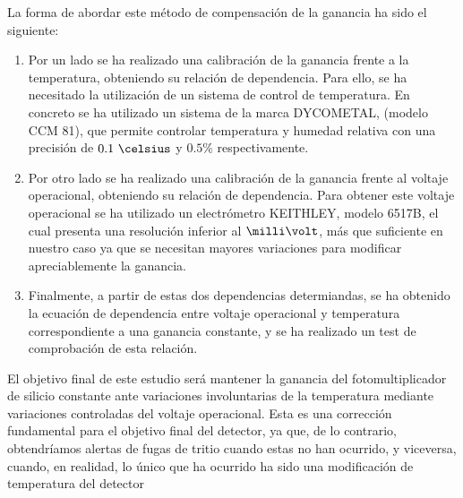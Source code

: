 La forma de abordar este método de compensación de la ganancia ha sido el siguiente:
\begin{enumerate}
\item {} 
Por un lado se ha realizado una calibración de la ganancia frente a la temperatura, obteniendo su relación de dependencia. Para ello, se ha necesitado la utilización de un sistema de control de temperatura. En concreto se ha utilizado un sistema de la marca DYCOMETAL, (modelo CCM 81), que permite controlar temperatura y humedad relativa con una precisión de $0.1~\celsius$   y  $0.5$\% respectivamente.

\item {} Por otro lado se ha realizado una calibración de la ganancia frente al voltaje operacional, obteniendo su relación de dependencia. Para obtener este voltaje operacional se ha utilizado un electrómetro KEITHLEY, modelo 6517B, el cual presenta una resolución inferior al $\milli\volt$, más que suficiente en nuestro caso ya que se necesitan mayores variaciones para modificar apreciablemente  la ganancia.

\item {} Finalmente, a partir de estas dos dependencias determiandas, se ha obtenido la ecuación de dependencia entre voltaje operacional y temperatura correspondiente a una ganancia constante,  y se ha realizado un test de comprobación de esta relación.
\end{enumerate}

El objetivo final de este estudio será mantener la ganancia del fotomultiplicador de silicio constante ante variaciones involuntarias de la temperatura mediante variaciones controladas del voltaje operacional. Esta es una corrección fundamental para el objetivo final del detector, ya que, de lo contrario, obtendríamos alertas de fugas de tritio cuando estas no han ocurrido, y viceversa,  cuando, en realidad, lo único que ha ocurrido ha sido una modificación de temperatura del detector